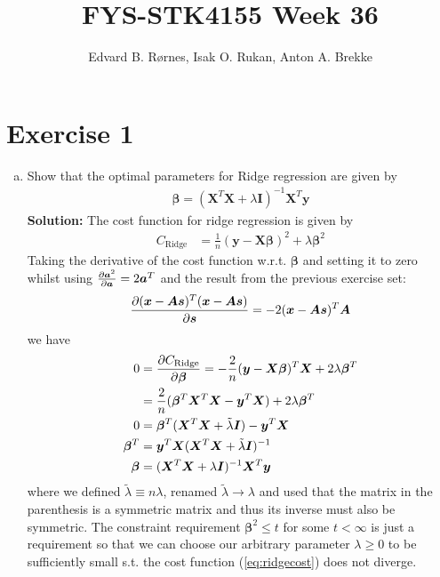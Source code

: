 \documentclass{article}
\title{FYS-STK4155 Week 36}
\author{Edvard B. Rørnes, Isak O. Rukan, Anton A. Brekke}
\newcommand{\f}[2]{\frac{#1}{#2}}
\begin{document}
	\maketitle
	\section*{Exercise 1}
	\begin{enumerate}[a)]
		\item Show that the optimal parameters for Ridge regression are given by
		\begin{align}
			\bm{\beta}=(\bm{X}^T\bm{X}+\lambda\bm{I})^{-1}\bm{X}^T\bm{y}
		\end{align}
		\textbf{Solution:}
		The cost function for ridge regression is given by
		\begin{align}
			C_\text{Ridge}&=\frac{1}{n}(\bm{y}-\bm{X}\bm{\beta})^2+\lambda\bm{\beta}^2
			\label{eq:ridgecost}
		\end{align}
		Taking the derivative of the cost function w.r.t. $\bm{\beta}$ and setting it to zero whilst using $\pdv{\bm{a}^2}{\bm{a}}=2\bm{a}^T$ and the result from the previous exercise set:
		\begin{align*}
			\pdv{(\bm{x}-\bm{As})^T(\bm{x}-\bm{As})}{\bm{s}}=-2(\bm{x}-\bm{As})^T\bm{A}
		\end{align*}
		we have
		\begin{align*}
			0&=\pdv{C_\text{Ridge}}{\bm{\beta}}=-\f2n(\bm{y}-\bm{X}\bm{\beta})^T\bm{X}+2\lambda\bm{\beta}^T\\
			&=\f2n(\bm{\beta}^T\bm{X}^T\bm{X}-\bm{y}^T\bm{X})+2\lambda\bm{\beta}^T\\
			0&=\bm{\beta}^T(\bm{X}^T\bm{X}+\tilde{\lambda}\bm{I})-\bm{y}^T\bm{X}\\
			\bm{\beta}^T&=\bm{y}^T\bm{X}(\bm{X}^T\bm{X}+\tilde{\lambda}\bm{I})^{-1}\\
			\bm{\beta}&=(\bm{X}^T\bm{X}+\lambda\bm{I})^{-1}\bm{X}^T\bm{y}
		\end{align*}
		where we defined $\tilde{\lambda}\equiv n\lambda$, renamed $\tilde{\lambda}\to\lambda$ and used that the matrix in the parenthesis is a symmetric matrix and thus its inverse must also be symmetric. The constraint requirement $\bm{\beta}^2\leq t$ for some $t<\infty$ is just a requirement so that we can choose our arbitrary parameter $\lambda\geq0$ to be sufficiently small s.t. the cost function (\ref{eq:ridgecost}) does not diverge.
		

\end{enumerate}
\end{document}
